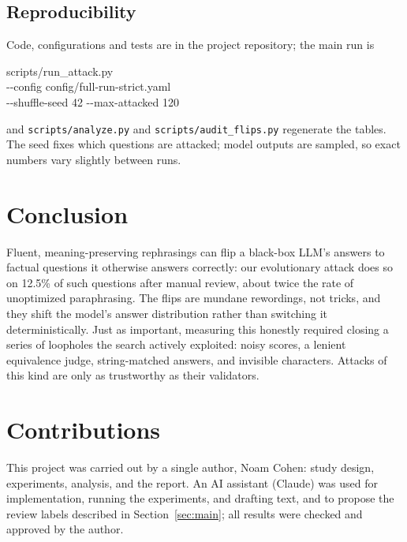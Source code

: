 \documentclass[sigconf,nonacm]{acmart}
\newcommand{\asrHuman}{12.5\%}
\begin{document}
\subsection{Reproducibility}
Code, configurations and tests are in the project repository; the main run is
\begin{flushleft}\small\ttfamily
scripts/run\_attack.py\\
\quad -{}-config config/full-run-strict.yaml\\
\quad -{}-shuffle-seed 42 -{}-max-attacked 120
\end{flushleft}
\noindent and \texttt{scripts/analyze.py} and \texttt{scripts/audit\_flips.py} regenerate the tables. The seed fixes which questions are attacked; model outputs are sampled, so exact numbers vary slightly between runs.

\section{Conclusion}
Fluent, meaning-preserving rephrasings can flip a black-box LLM's answers to factual questions it otherwise answers correctly: our evolutionary attack does so on \asrHuman{} of such questions after manual review, about twice the rate of unoptimized paraphrasing. The flips are mundane rewordings, not tricks, and they shift the model's answer distribution rather than switching it deterministically. Just as important, measuring this honestly required closing a series of loopholes the search actively exploited: noisy scores, a lenient equivalence judge, string-matched answers, and invisible characters. Attacks of this kind are only as trustworthy as their validators.

\section{Contributions}
This project was carried out by a single author, Noam Cohen: study design, experiments, analysis, and the report. An AI assistant (Claude) was used for implementation, running the experiments, and drafting text, and to propose the review labels described in Section~\ref{sec:main}; all results were checked and approved by the author.
\end{document}
